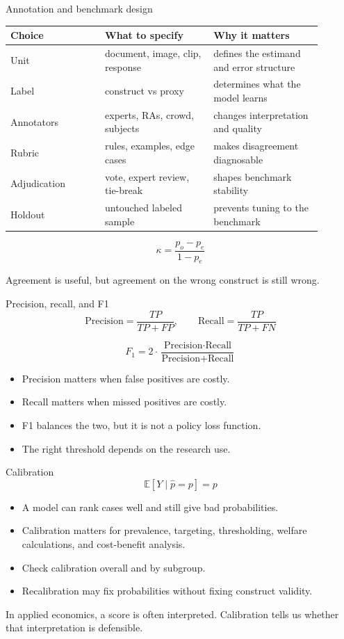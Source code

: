\documentclass[aspectratio=169,11pt]{beamer}
\newcommand{\E}{\mathbb{E}}
\newcommand{\1}{\mathbf{1}}
\begin{document}
\begin{frame}{Annotation and benchmark design}
\small
\begin{tabular}{p{0.27\linewidth} p{0.31\linewidth} p{0.31\linewidth}}
\toprule
Choice & What to specify & Why it matters \\
\midrule
Unit & document, image, clip, response & defines the estimand and error structure \\
Label & construct vs proxy & determines what the model learns \\
Annotators & experts, RAs, crowd, subjects & changes interpretation and quality \\
Rubric & rules, examples, edge cases & makes disagreement diagnosable \\
Adjudication & vote, expert review, tie-break & shapes benchmark stability \\
Holdout & untouched labeled sample & prevents tuning to the benchmark \\
\bottomrule
\end{tabular}

\medskip
\[
\kappa=\frac{p_o-p_e}{1-p_e}
\]

Agreement is useful, but agreement on the wrong construct is still wrong.
\end{frame}

\begin{frame}{Precision, recall, and F1}
\small
\[
\text{Precision}=\frac{TP}{TP+FP},
\qquad
\text{Recall}=\frac{TP}{TP+FN}
\]

\[
F_1
=
2\cdot
\frac{\text{Precision}\cdot\text{Recall}}
{\text{Precision}+\text{Recall}}
\]

\begin{itemize}
    \item Precision matters when false positives are costly.
    \item Recall matters when missed positives are costly.
    \item F1 balances the two, but it is not a policy loss function.
    \item The right threshold depends on the research use.
\end{itemize}
\end{frame}

\begin{frame}{Calibration}
\small
\[
\E[Y\mid \widehat p=p]=p
\]

\begin{itemize}
    \item A model can rank cases well and still give bad probabilities.
    \item Calibration matters for prevalence, targeting, thresholding, welfare calculations, and cost-benefit analysis.
    \item Check calibration overall and by subgroup.
    \item Recalibration may fix probabilities without fixing construct validity.
\end{itemize}

\medskip
In applied economics, a score is often interpreted. Calibration tells us whether that interpretation is defensible.
\end{frame}
\end{document}
